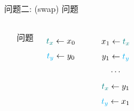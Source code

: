 \begin{frame}{}
	\begin{center}
		问题二:  (swap) 问题
	\end{center}

	\begin{columns}
			\pause
			\begin{center}
			\end{center}
		  \pause
			\begin{center}
				问题
			\end{center}
		  \pause
		  \begin{gather*}
				\textcolor{teal}{t_{x}} \gets x_{0} \\[3pt]
				\textcolor{cyan}{t_{y}} \gets y_{0}
			\end{gather*}
			\begin{center}
			\end{center}
		  \begin{gather*}
				x_{1} \gets \textcolor{teal}{t_{x}} \\[3pt]
				y_{1} \gets \textcolor{cyan}{t_{y}} \\[3pt]
				\cdots \\[3pt]
				\textcolor{teal}{t_{x}} \gets y_{1} \\[3pt]
				\textcolor{cyan}{t_{y}} \gets x_{1} \\[3pt]
			\end{gather*}
	\end{columns}
\end{frame}


